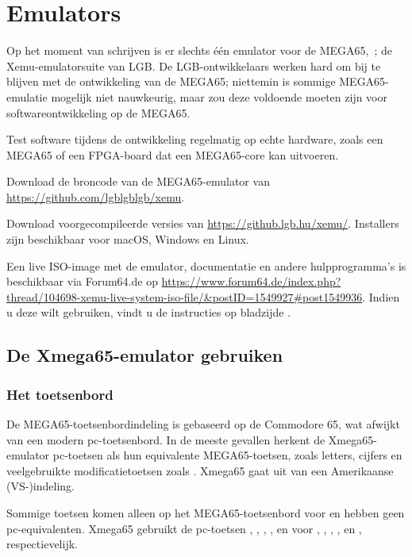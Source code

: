 \chapter{Emulators}

Op het moment van schrijven is er slechts één emulator voor de MEGA65,\ ; de Xemu-emulatorsuite van LGB. De LGB-ontwikkelaars werken hard om bij te blijven met de ontwikkeling van de MEGA65; niettemin is sommige MEGA65-emulatie mogelijk niet nauwkeurig, maar zou deze voldoende moeten zijn voor softwareontwikkeling op de MEGA65.


Test software tijdens de ontwikkeling regelmatig op echte hardware, zoals een MEGA65 of een FPGA-board dat een MEGA65-core kan uitvoeren.

Download de broncode van de MEGA65-emulator van \url{https://github.com/lgblgblgb/xemu}.

Download voorgecompileerde versies van \url{https://github.lgb.hu/xemu/}. Installers
zijn beschikbaar voor macOS, Windows en Linux.

Een live ISO-image met de emulator, documentatie en andere hulpprogramma's is beschikbaar via
Forum64.de
op \url{https://www.forum64.de/index.php?thread/104698-xemu-live-system-iso-file/\&postID=1549927\#post1549936}.
Indien u deze wilt gebruiken, vindt u de instructies op bladzijde \pageref{sec:live-iso-image}.

\section{De Xmega65-emulator gebruiken}

\subsection{Het toetsenbord}
\label{sec:xemu-keyboard}

De MEGA65-toetsenbordindeling is gebaseerd op de Commodore 65, wat afwijkt van een modern pc-toetsenbord. In de meeste gevallen herkent de Xmega65-emulator pc-toetsen als hun equivalente MEGA65-toetsen, zoals letters, cijfers en veelgebruikte modificatietoetsen zoals . Xmega65 gaat uit van een Amerikaanse (VS-)indeling.

Sommige toetsen komen alleen op het MEGA65-toetsenbord voor en hebben geen pc-equivalenten. Xmega65
gebruikt de pc-toetsen , , ,
,  en  voor
\megakey{+}, \megakey{\pounds}, , ,
 en , respectievelijk.

